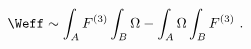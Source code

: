 \begin{equation}
  \Weff \sim \int_A F^{(3)} \int_B \Omega - \int_A \Omega \int_B F^{(3)}~.
\end{equation} 

